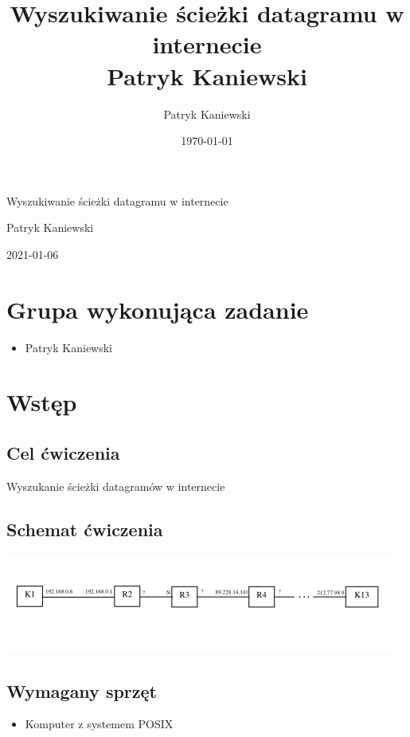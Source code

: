 \documentclass[11pt]{article}
\author{Patryk Kaniewski}
\date{\today}
\title{Wyszukiwanie ścieżki datagramu w internecie \\
Patryk Kaniewski}
\begin{document}
\begin{titlepage}
\begin{center}
{\Huge Wyszukiwanie ścieżki datagramu w internecie \par}
\vspace{2cm}
{\Large Patryk Kaniewski \par
}\vspace{2cm}
{\large 2021-01-06 }
\end{center}
\end{titlepage}
\setcounter{tocdepth}{2}
\tableofcontents \clearpage

\section{Grupa wykonująca zadanie}
\label{sec:org544e552}
\begin{itemize}
\item Patryk Kaniewski
\end{itemize}

\section{Wstęp}
\label{sec:orge9246f6}
\subsection{Cel ćwiczenia}
\label{sec:org4a05b4c}
Wyszukanie ścieżki datagramów w internecie
\subsection{Schemat ćwiczenia}
\label{sec:org22d4e51}
\begin{center}
\includegraphics[width=.9\linewidth]{./schemat.png}
\end{center}
\subsection{Wymagany sprzęt}
\label{sec:org63bc0a9}
\begin{itemize}
\item Komputer z systemem POSIX
\end{itemize}
\end{document}

